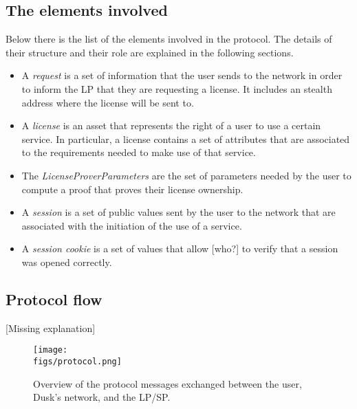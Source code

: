 \subsection{The elements involved}

Below there is the list of the elements involved in the protocol. The details of their structure and their role are explained in the following sections. 

\begin{itemize}
	\item A \emph{request} is a set of information that the user sends to the network in order to inform the LP that they are requesting a license. It includes an stealth address where the license will be sent to.
	\item A \emph{license} is an asset that represents the right of a user to use a certain service. In particular, a license contains a set of attributes that are associated to the requirements needed to make use of that service.
	\item The \emph{LicenseProverParameters} are the set of parameters needed by the user to compute a proof that proves their license ownership.
	\item A \emph{session} is a set of public values sent by the user to the network that are associated with the initiation of the use of a service.
	\item A \emph{session cookie} is a set of values that allow {\color{red}[who?]} to verify that a session was opened correctly.
\end{itemize}

\subsection{Protocol flow}

{\color{red}[Missing explanation]}

\begin{figure}[h]
	\centering
	\texttt{[image: \\figs/protocol.png]}
	\caption{Overview of the protocol messages exchanged between the user, Dusk's network, and the LP/SP.}
	\label{fig:protocol}
\end{figure}

